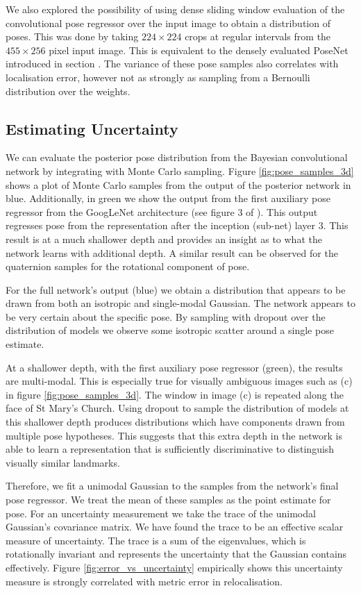 We also explored the possibility of using dense sliding window evaluation of the convolutional pose regressor over the input image to obtain a distribution of poses. This was done by taking $224\times224$ crops at regular intervals from the $455\times256$ pixel input image. This is equivalent to the densely evaluated PoseNet introduced in section \citep{kendall2015posenet}. The variance of these pose samples also correlates with localisation error, however not as strongly as sampling from a Bernoulli distribution over the weights.

\subsection{Estimating Uncertainty}

We can evaluate the posterior pose distribution from the Bayesian convolutional network by integrating with Monte Carlo sampling. Figure \ref{fig:pose_samples_3d} shows a plot of Monte Carlo samples from the output of the posterior network in blue. Additionally, in green we show the output from the first auxiliary pose regressor from the GoogLeNet architecture (see figure 3 of \citep{szegedy2014going}). This output regresses pose from the representation after the inception (sub-net) layer 3. This result is at a much shallower depth and provides an insight as to what the network learns with additional depth. A similar result can be observed for the quaternion samples for the rotational component of pose.

For the full network's output (blue) we obtain a distribution that appears to be drawn from both an isotropic and single-modal Gaussian. The network appears to be very certain about the specific pose. By sampling with dropout over the distribution of models we observe some isotropic scatter around a single pose estimate.

At a shallower depth, with the first auxiliary pose regressor (green), the results are multi-modal. This is especially true for visually ambiguous images such as (c) in figure \ref{fig:pose_samples_3d}. The window in image (c) is repeated along the face of St Mary's Church. Using dropout to sample the distribution of models at this shallower depth produces distributions which have components drawn from multiple pose hypotheses. This suggests that this extra depth in the network is able to learn a representation that is sufficiently discriminative to distinguish visually similar landmarks.

Therefore, we fit a unimodal Gaussian to the samples from the network's final pose regressor. We treat the mean of these samples as the point estimate for pose. For an uncertainty measurement we take the trace of the unimodal Gaussian's covariance matrix. We have found the trace to be an effective scalar measure of uncertainty. The trace is a sum of the eigenvalues, which is rotationally invariant and represents the uncertainty that the Gaussian contains effectively. Figure \ref{fig:error_vs_uncertainty} empirically shows this uncertainty measure is strongly correlated with metric error in relocalisation.

